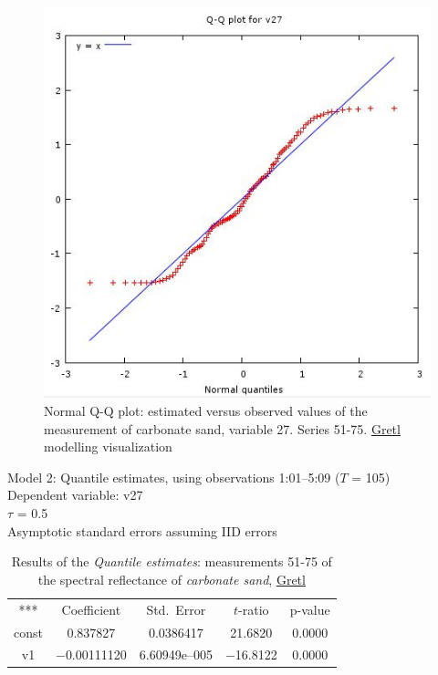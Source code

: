 \documentclass[11pt]{article}
\begin{document}
\begin{appendices}
\begin{figure}[H]
	\begin{center}
		\includegraphics[scale=0.4]{G-QQplot-sand.jpg}
		\caption{Normal Q-Q plot: estimated versus observed values of the measurement of carbonate sand, variable 27. Series 51-75. \href{http://gretl.sourceforge.net/}{Gretl} modelling visualization­}
	\label{fig:A.30}
	\end{center}
\end{figure}

\begin{table}[H]
	\caption{Results of the \textit{Quantile estimates}: measurements 51-75 of the spectral reflectance of \textit{carbonate sand}, \href{http://gretl.sourceforge.net/}{Gretl}}
	\begin{center}
		Model 2: Quantile estimates, using observations 1:01--5:09 ($T$ = 105)\\
		Dependent variable: v27\\
		$\tau$ = 0.5\\
		Asymptotic standard errors assuming IID errors\\

\vspace{1em}

\begin{tabular}{c c c c c}
	***   & {Coefficient} & {Std.\ Error} & {$t$-ratio} & {p-value} \\[1ex]
	const &  0.837827 &    0.0386417 &      21.6820 &         0.0000 \\
	v1 &   $-$0.00111120 &     6.60949\textrm{e--005} &       $-$16.8122 &         0.0000 \\ \hline \hline
\end{tabular}


\end{center}
\end{table}
\end{appendices}
\end{document}

